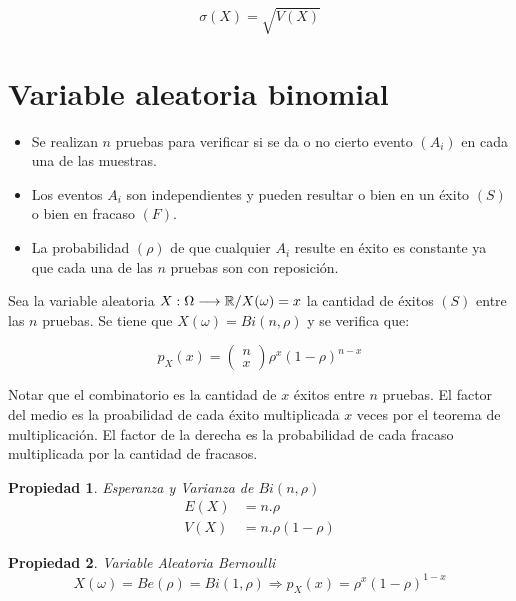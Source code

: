 \documentclass[a5paper,12pt,twoside]{book}
\newtheorem{prop}{{Propiedad}}[chapter]
\begin{document}
\begin{equation}
\sigma(X)=\sqrt{V(X)}
\end{equation}

\section{Variable aleatoria binomial}

\begin{itemize}
\item Se realizan $n$ pruebas para verificar si se da o no cierto evento $(A_i)$ en cada una de las muestras.

\item Los eventos $A_i$ son independientes y pueden resultar o bien en un éxito $(S)$ o bien en fracaso $(F)$.

\item La probabilidad $(\rho)$ de que cualquier $A_i$ resulte en éxito es constante ya que cada una de las $n$ pruebas son con reposición.
\end{itemize}

Sea la variable aleatoria $X:\Omega \longrightarrow \mathbb{R}/X(\omega)=x$ la cantidad de éxitos $(S)$ entre las $n$ pruebas. Se tiene que $X(\omega)=Bi(n,\rho)$ y se verifica que:

\begin{equation}
p_X(x)=
\begin{pmatrix}
n\\
x
\end{pmatrix}
\rho^x (1-\rho)^{n-x}
\end{equation}

Notar que el combinatorio es la cantidad de $x$ éxitos entre $n$ pruebas. El factor del medio es la proabilidad de cada éxito multiplicada $x$ veces por el teorema de multiplicación. El factor de la derecha es la probabilidad de cada fracaso multiplicada por la cantidad de fracasos.

\begin{prop}
Esperanza y Varianza de $Bi(n,\rho)$
\begin{equation}
\begin{split}
E(X) &= n.\rho
\\
V(X) &= n.\rho (1-\rho)
\end{split}
\end{equation}
\end{prop}

\begin{prop}
Variable Aleatoria Bernoulli
$$ X(\omega)=Be(\rho)=Bi(1,\rho) \Rightarrow p_X(x)=\rho^x(1-\rho)^{1-x} $$
\end{prop}
\end{document}
